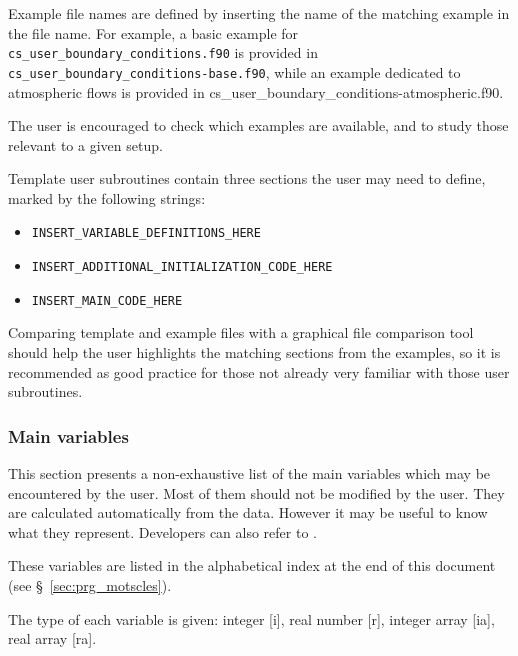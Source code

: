 {{{Example file names are defined by inserting the name of the matching example
in the file name. For example, a basic example for
\texttt{cs\_user\_boundary\_conditions.f90} is provided in \\
\texttt{cs\_user\_boundary\_conditions-base.f90}, while an example dedicated
to atmospheric flows is provided in
{cs\_user\_boundary\_conditions-atmospheric.f90}.

The user is encouraged to check which examples are available, and to study
those relevant to a given setup.

Template user subroutines contain three sections the user may need to define,
marked by the following strings:

\begin{itemize}
\item \texttt{INSERT\_VARIABLE\_DEFINITIONS\_HERE}
\item \texttt{INSERT\_ADDITIONAL\_INITIALIZATION\_CODE\_HERE}
\item \texttt{INSERT\_MAIN\_CODE\_HERE}
\end{itemize}

Comparing template and example files with a graphical file comparison tool
should help the user highlights the matching sections from the examples,
so it is recommended as good practice for those not already very familiar
with those user subroutines.

\subsubsection{Main variables}

This section presents a non-exhaustive list of the main variables which
may be encountered by the user. Most of them should not be modified by the
user. They are calculated automatically from the data. However it may be
useful to know what they represent.
Developers can also refer to \cite{theory}.

These variables are listed in the alphabetical index at the end of this
document (see \S~\ref{sec:prg_motscles}).

The type of each variable is given: integer [i], real number [r],
integer array [ia], real array [ra].

\label{sec:prg_dimensions}


}}}
